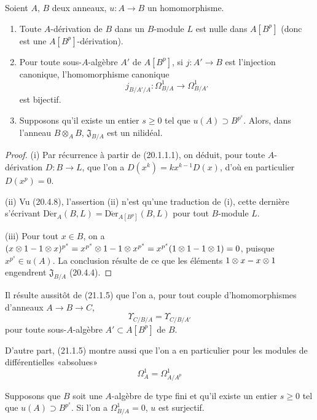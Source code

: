 \begin{proposition}[21.1.5]
\label{0.21.1.5-fr}
Soient $A$, $B$ deux anneaux, $u:A\to B$ un homomorphisme.
\begin{enumerate}
  \item[\textup{(i)}] Toute $A$-dérivation de $B$ dans un $B$-module $L$ est nulle
  dans $A[B^p]$ (donc est une $A[B^p]$-dérivation).
  \item[\textup{(ii)}] Pour toute sous-$A$-algèbre $A'$ de $A[B^p]$, si
  $j:A'\to B$ est l'injection canonique, l'homomorphisme canonique
  \[
  j_{B/A'/A}:\Omega^1_{B/A}\longrightarrow\Omega^1_{B/A'}
  \]
  est bijectif.
  \item[\textup{(iii)}] Supposons qu'il existe un entier $s\geq0$ tel que
  $u(A)\supset B^{p^s}$. Alors, dans l'anneau $B\otimes_A B$,
  $\mathfrak J_{B/A}$ est un nilidéal.
\end{enumerate}
\end{proposition}

\begin{proof}
(i) Par récurrence à partir de (20.1.1.1), on déduit, pour toute
$A$-dérivation $D:B\to L$, que l'on a $D(x^k)=kx^{k-1}D(x)$, d'où en particulier
$D(x^p)=0$.

(ii) Vu (20.4.8), l'assertion (ii) n'est qu'une traduction de (i), cette
dernière s'écrivant $\operatorname{D\acute{e}r}_A(B,L)=\operatorname{D\acute{e}r}_{A[B^p]}(B,L)$
pour tout $B$-module $L$.

(iii) Pour tout $x\in B$, on a
$(x\otimes1-1\otimes x)^{p^s}=x^{p^s}\otimes1-1\otimes x^{p^s}=x^{p^s}(1\otimes1-1\otimes1)=0$,
puisque $x^{p^s}\in u(A)$. La conclusion résulte de ce que les éléments
$1\otimes x- x\otimes1$ engendrent $\mathfrak J_{B/A}$ (20.4.4).
\end{proof}

Il résulte aussitôt de (21.1.5) que l'on a, pour tout couple d'homomorphismes
d'anneaux $A\to B\to C$,
\begin{equation}
\tag{21.1.5.1}
\label{0.21.1.5.1-fr}
\Upsilon_{C/B/A}=\Upsilon_{C/B/A'}
\end{equation}
pour toute sous-$A$-algèbre $A'\subset A[B^p]$ de $B$.

D'autre part, (21.1.5) montre aussi que l'on a en particulier pour les modules de
différentielles «absolues»
\begin{equation}
\tag{21.1.5.2}
\label{0.21.1.5.2-fr}
\Omega^1_A=\Omega^1_{A/A^p}
\end{equation}

\begin{corollary}[21.1.6]
\label{0.21.1.6-fr}
Supposons que $B$ soit une $A$-algèbre de type fini et qu'il existe un
entier $s\geq0$ tel que $u(A)\supset B^{p^s}$. Si l'on a $\Omega^1_{B/A}=0$,
$u$ est surjectif.
\end{corollary}

